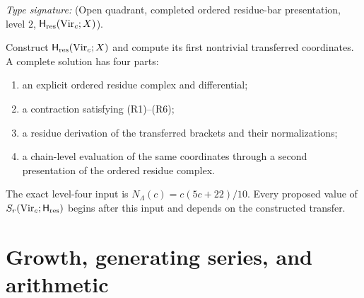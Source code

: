 \begin{problem}
\ClaimStatusOpen
\label{thm:s6-virasoro-closed-form}
\label{thm:s7-virasoro-closed-form}
\label{thm:s8-virasoro-closed-form}
\label{thm:s9-virasoro-closed-form}
\label{thm:s10-virasoro-closed-form}
\label{thm:s11-virasoro-closed-form}
\label{prop:sth-boundary-checks}
\label{prop:sth-summary}
\label{prop:sth-virasoro-rational-through-8}
\label{rem:sth-rectified-normalisation}
\label{rem:sth-s6-pole}
\label{rem:sth-s7-parity}
\label{rem:sth-c13-self-dual}
\label{rem:sth-extending-beyond-8}
\emph{Type signature:}
\textup{(Open quadrant, completed ordered residue-bar presentation,
level \(2\), \(\mathsf H_{\mathrm{res}}(\mathrm{Vir}_c;X)\)).}

Construct $\mathsf H_{\mathrm{res}}(\mathrm{Vir}_c;X)$ and compute its first
nontrivial transferred coordinates.  A complete solution has four
parts:

\begin{enumerate}[label=\textup{(\roman*)}]
\item an explicit ordered residue complex and differential;
\item a contraction satisfying \textup{(R1)--(R6)};
\item a residue derivation of the transferred brackets and their
normalizations;
\item a chain-level evaluation of the same coordinates through a
second presentation of the ordered residue complex.
\end{enumerate}

The exact level-four input is
$N_\Lambda(c)=c(5c+22)/10$.  Every proposed value of
$S_r(\mathrm{Vir}_c;\mathsf H_{\mathrm{res}})$ begins after this input and
depends on the constructed transfer.
\end{problem}

\section{Growth, generating series, and arithmetic}
\label{sec:sth-leading-asymp}
\label{sec:sth-kummer-absence}
\label{sec:sth-motivic}
\label{subsec:subleading-asymptotic}
\label{subsec:sub-subleading-asymptotic}
\label{subsec:tier-4-asymptotic}
\label{subsec:four-tier-arithmetic-database}

